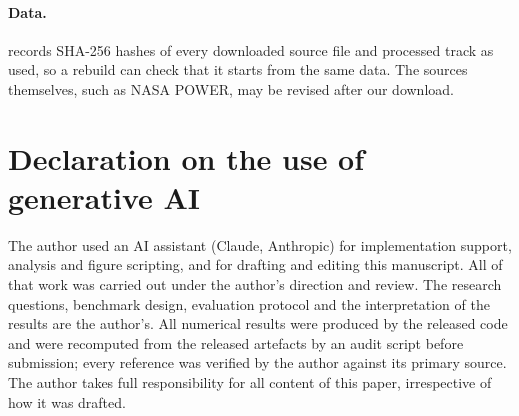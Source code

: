 \paragraph{Data.}  records SHA-256 hashes of every downloaded source file and
processed track as used, so a rebuild can check that it starts from the same data. The sources themselves, such as
NASA POWER, may be revised after our download.

\section*{Declaration on the use of generative AI}

The author used an AI assistant (Claude, Anthropic) for implementation support, analysis and figure scripting, and
for drafting and editing this manuscript. All of that work was carried out under the author's direction and
review. The research
questions, benchmark design, evaluation protocol and the interpretation of the results are the author's. All
numerical results were produced by the released code and were recomputed from the released artefacts by an audit
script before submission; every reference was verified by the author against its primary source. The author takes
full responsibility for all content of this paper, irrespective of how it was drafted.
